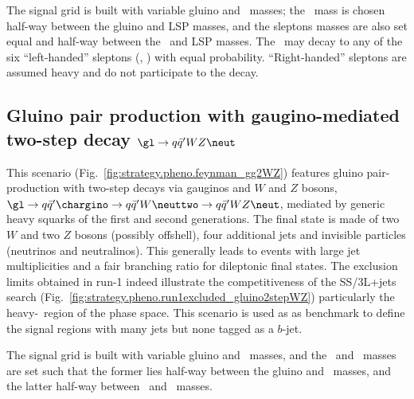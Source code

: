 The signal grid is built with variable gluino and \neut\ masses; the \neuttwo\ mass is chosen half-way between the gluino and LSP masses, 
and the sleptons masses are also set equal and half-way between the \neuttwo\ and LSP masses. 
The \neuttwo\ may decay to any of the six ``left-handed'' sleptons (\slep, \snu) with equal probability. 
``Right-handed'' sleptons are assumed heavy and do not participate to the decay. 


\subsection*{Gluino pair production with gaugino-mediated two-step decay $\gl\to q\bar q'WZ\neut$}
\label{subsec:signals_g2wz}

This scenario (Fig.~\ref{fig:strategy.pheno.feynman_gg2WZ}) features gluino pair-production with two-step decays via gauginos and $W$ and $Z$ bosons, 
$\gl\to q\bar{q}'\chargino\to q\bar{q}'W\neuttwo\to q\bar{q}'WZ\neut$, 
mediated by generic heavy squarks of the first and second generations. 
The final state is made of two $W$ and two $Z$ bosons (possibly offshell), 
four additional jets and invisible particles (neutrinos and neutralinos). 
This generally leads to events with large jet multiplicities and a fair branching ratio for dileptonic final states. 
The exclusion limits obtained in run-1 indeed illustrate the competitiveness of the SS/3L+jets search (Fig.~\ref{fig:strategy.pheno.run1excluded_gluino2stepWZ})
particularly the heavy-\neut\ region of the phase space. 
This scenario is used as as benchmark to define the signal regions with many jets but none tagged as a $b$-jet. 

The signal grid is built with variable gluino and \neut\ masses, 
and the \chargino\ and \neuttwo\ masses are set such that the former lies half-way between the gluino and \neut\ masses, 
and the latter half-way between \chargino\ and \neut\ masses. 

